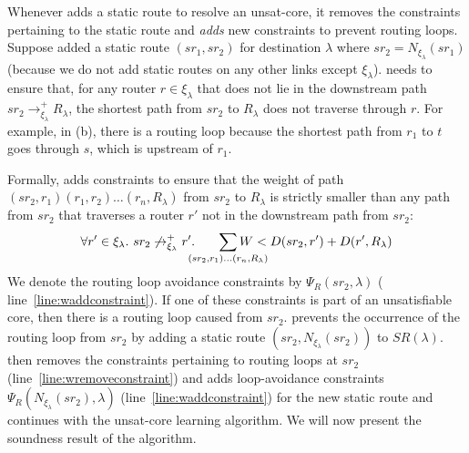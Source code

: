 Whenever \name adds a static route to resolve an unsat-core,
it removes the constraints pertaining to 
the static route and \emph{adds} new constraints to prevent
routing loops. 
Suppose \name added a static route $(sr_1, sr_2)$ for destination
$\lambda$ where $sr_2 = N_{\xi_\lambda}(sr_1)$ (because we do not add
static routes on any other links except $\xi_\lambda$). \name needs to
ensure that, for any router $r\in\xi_\lambda$ that does not 
lie in the downstream path $sr_2 \rightarrow^+_{\xi_\lambda} R_\lambda$, 
the shortest path from $sr_2$ to $R_\lambda$ does not traverse through 
$r$. For example, 
in (b), there is a routing loop because
 the shortest path from $r_1$ to $t$ goes through $s$, which is upstream of $r_1$. 

Formally, \name adds constraints to 
ensure that the weight
of path $(sr_2, r_1)(r_1, r_2)\ldots(r_n,R_\lambda)$
from $sr_2$ to $R_\lambda$ is 
strictly smaller than any path from $sr_2$ that traverses a
router $r'$ not in the downstream path from $sr_2$: 
\begin{equation} \label{eq:rla}
\forall r' \in \xi_\lambda. ~sr_2 \not\rightarrow_{\xi_\lambda}^+ r'. 
\hspace{0.6cm}\sum_{\mathclap{\substack{(sr_2, r_1)\ldots(r_n,R_\lambda)}}} 
W < D(sr_2, r') + D(r', R_\lambda) 
\end{equation}
We denote the routing loop avoidance 
constraints by $\Psi_R(sr_2, \lambda)$ 
( line~\ref{line:waddconstraint}). 
If one of these constraints is part of an unsatisfiable
core, then there is a routing 
loop caused from $sr_2$. 
\name 
prevents
the occurrence of the routing loop from $sr_2$
by adding a static route 
$(sr_2, N_{\xi_\lambda}(sr_2))$ to $SR(\lambda)$. 
\name then removes the constraints pertaining to routing
loops at $sr_2$ (line~\ref{line:wremoveconstraint}) and 
adds loop-avoidance constraints $\Psi_R(N_{\xi_\lambda}(sr_2), 
\lambda)$ (line~\ref{line:waddconstraint}) for the new static
route and continues with the unsat-core learning algorithm. We will
now present the soundness result of the algorithm.



